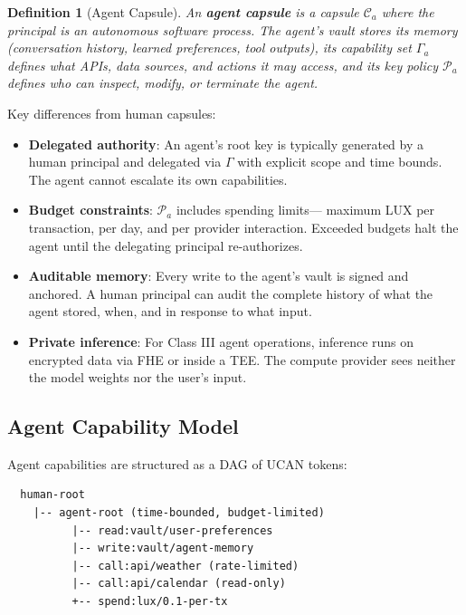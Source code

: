 \documentclass[11pt,a4paper]{article}
\newtheorem{definition}{Definition}[section]
\begin{document}
\begin{definition}[Agent Capsule]\label{def:agent}
An \textbf{agent capsule} is a capsule $\mathcal{C}_a$ where the principal is
an autonomous software process. The agent's vault stores its memory (conversation
history, learned preferences, tool outputs), its capability set $\Gamma_a$
defines what APIs, data sources, and actions it may access, and its key policy
$\mathcal{P}_a$ defines who can inspect, modify, or terminate the agent.
\end{definition}

Key differences from human capsules:

\begin{itemize}[nosep]
  \item \textbf{Delegated authority}: An agent's root key is typically generated
        by a human principal and delegated via $\Gamma$ with explicit scope
        and time bounds. The agent cannot escalate its own capabilities.
  \item \textbf{Budget constraints}: $\mathcal{P}_a$ includes spending limits---
        maximum LUX per transaction, per day, and per provider interaction.
        Exceeded budgets halt the agent until the delegating principal
        re-authorizes.
  \item \textbf{Auditable memory}: Every write to the agent's vault is signed
        and anchored. A human principal can audit the complete history of what
        the agent stored, when, and in response to what input.
  \item \textbf{Private inference}: For Class III agent operations, inference
        runs on encrypted data via FHE or inside a TEE. The compute provider
        sees neither the model weights nor the user's input.
\end{itemize}

\subsection{Agent Capability Model}

Agent capabilities are structured as a DAG of UCAN tokens:

\begin{verbatim}
  human-root
    |-- agent-root (time-bounded, budget-limited)
          |-- read:vault/user-preferences
          |-- write:vault/agent-memory
          |-- call:api/weather (rate-limited)
          |-- call:api/calendar (read-only)
          +-- spend:lux/0.1-per-tx
\end{verbatim}
\end{document}
